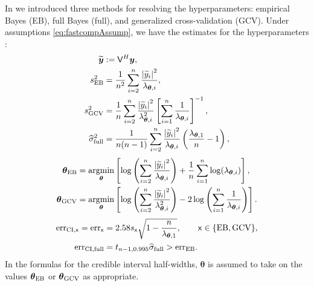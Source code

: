 \documentclass[graybox,footinfo]{svmult}
\newcommand{\bm}[1]{\boldsymbol{#1}}
\newcommand{\vtheta}{{\bm{\theta}}}
\newcommand{\vy}{\bm{y}}
\newcommand{\mV}{\mathsf{V}}
\newcommand{\hsigma}{\widehat{\sigma}}
\newcommand{\MLE}{\textup{EB}}
\newcommand{\full}{\textup{full}}
\newcommand{\GCV}{\textup{GCV}}
\newcommand{\CI}{\textup{CI}}
\newcommand{\err}{\textup{err}}
\def\abs#1{\ensuremath{\left \lvert #1 \right \rvert}}
\providecommand{\argmin}{\operatorname*{argmin}}
\begin{document}
In \cite{RatHic19a} we introduced three methods for resolving the hyperparameters:  empirical Bayes (EB), full Bayes (full), and generalized cross-validation (GCV).  Under assumptions \eqref{eq:fastcompAssump}, we have the estimates for the hyperparameters \cite[Theorem 2]{RatHic19a}:
		\begin{align*}
		\nonumber 
		\widetilde{\vy} &:= \mV^H \vy, \\
		\nonumber
		s^2_\MLE 
		& =
		\frac{1}{n^2} 
		\sum_{i=2}^n \frac{\abs{\widetilde{y}_i}^2}{\lambda_{\vtheta,i}},  \\
		\nonumber 
		s^2_{\textup{GCV}} & =  \frac 1{n} \sum_{i=2}^n \frac{\abs{\widetilde{y}_i}^2}{\lambda_{\vtheta,i}^2}  \left [ \sum_{i=1}^n \frac{1}{\lambda_{\vtheta,i}} \right]^{-1}, \\
		\nonumber
		\widehat{\sigma}^2_{\textup{full}} &= \frac{1}{n(n-1)} \sum_{i=2}^n \frac{\abs{\widetilde{y}_i}^2}{\lambda_{\vtheta,i}}  \left(\frac{\lambda_{\vtheta,1}}{n}  - 1  \right), 
		\end{align*}
	\begin{subequations}
		\label{eqn:fastTheta}
		\begin{align}
		\label{eqn:fastThetaMLE}
		\vtheta_\MLE
		&= 
		\argmin_{\vtheta}
		\left[
		\log\left(
		\sum_{i=2}^n \frac{\abs{\widetilde{y}_i}^2}{\lambda_{\vtheta,i}}
		\right) 
		+ \frac{1}{n}\sum_{i=1}^n \log(\lambda_{\vtheta,i})
		\right],\\
		\label{eqn:fastThetaGCV} 
		\vtheta_{\GCV} 
		&= \argmin_\vtheta \left[ \log \left ( \sum_{i=2}^n \frac{\abs{\widetilde{y}_i}^2}{\lambda_{\vtheta,i}^2} 
		\right)  
		-2\log\left( \sum_{i=1}^n \frac{1}{\lambda_{\vtheta,i}} \right)
		\right].
		\end{align}
	\end{subequations}
\begin{subequations}
	\label{errSimple}
	\begin{align}
		\label{eqn:err_MLEGCV}
		\err_{\CI,\mathsf{x}} = \err_{\mathsf{x}} & = 2.58 s_{\mathsf{x}} \sqrt{1 - \frac{n}{\lambda_{\vtheta,1}} }, \qquad \mathsf{x} \in \{\MLE, \GCV\},  \\ 
		\err_{\CI,\textup{full}} 
		& = t_{n-1,0.995} \hsigma_{\textup{full}} > \err_\MLE. \label{FJH:eq:errFull}
	\end{align}
\end{subequations}
In the formulas for the credible interval half-widths, $\vtheta$ is assumed to take on the values $\vtheta_{\MLE}$ or $\vtheta_{\GCV}$ as appropriate.
\end{document}
